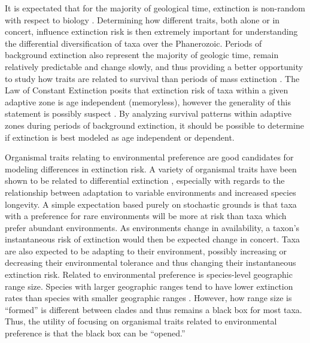 \documentclass[12pt,letterpaper]{article}
\begin{document}
It is expectated that for the majority of geological time, extinction is non-random with respect to biology \citep{Jablonski1986,Alexander1977,Harnik2011,Johnson2002b,Kitchell1986,Nurnberg2013a,Payne2007}. Determining how different traits, both alone or in concert, influence extinction risk is then extremely important for understanding the differential diversification of taxa over the Phanerozoic. Periods of background extinction also represent the majority of geologic time, remain relatively predictable and change slowly, and thus providing a better opportunity to study how traits are related to survival than periods of mass extinction \citep{Jablonski1986,Raup1988}. The Law of Constant Extinction \citep{VanValen1973} posits that extinction risk of taxa within a given adaptive zone is age independent (memoryless), however the generality of this statement is possibly suspect \citep{Drake2014,Raup1975,Sepkoski1975,Finnegan2008}. By analyzing survival patterns within adaptive zones during periods of background extinction, it should be possible to determine if extinction is best modeled as age independent or dependent.

Organismal traits relating to environmental preference are good candidates for modeling differences in extinction risk. A variety of organismal traits have been shown to be related to differential extinction \citep{Foote2013,Liow2007b,Baumiller1993,Nurnberg2013a}, especially with regards to the relationship between adaptation to variable environments and increased species longevity. A simple expectation based purely on stochastic grounds is that taxa with a preference for rare environments will be more at risk than taxa which prefer abundant environments. As environments change in availability, a taxon's instantaneous risk of extinction would then be expected change in concert. Taxa are also expected to be adapting to their environment, possibly increasing or decreasing their environmental tolerance and thus changing their instantaneous extinction risk. Related to environmental preference is species-level geographic range size. Species with larger geographic ranges tend to have lower extinction rates than species with smaller geographic ranges \citep{Jablonski1986,Harnik2013,Nurnberg2013a,Jablonski2003,Roy2009c}. However, how range size is ``formed'' is different between clades \citep{Jablonski1987} and thus remains a black box for most taxa. Thus, the utility of focusing on organismal traits related to environmental preference is that the black box can be ``opened.''
\end{document}
